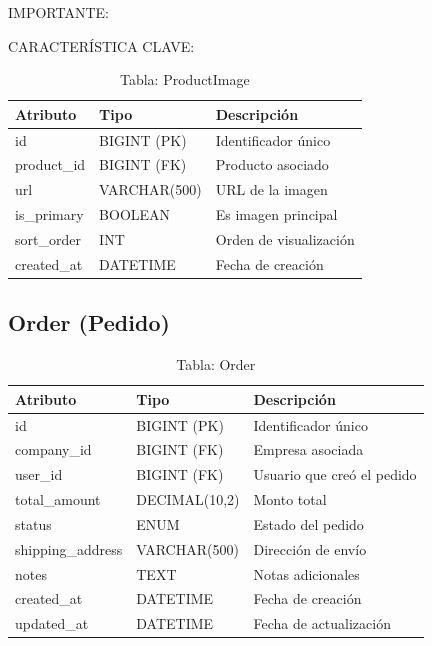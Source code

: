 \documentclass[12pt,a4paper,oneside]{book}
\begin{document}
\begin{alert}{IMPORTANTE:}
\begin{info}{CARACTERÍSTICA CLAVE:}
\begin{table}[ht]
    \centering
    \caption{Tabla: ProductImage}
    \begin{tabular}{@{}lll@{}}
        \toprule
        \textbf{Atributo} & \textbf{Tipo} & \textbf{Descripción} \\
        \midrule
        id & BIGINT (PK) & Identificador único \\
        product\_id & BIGINT (FK) & Producto asociado \\
        url & VARCHAR(500) & URL de la imagen \\
        is\_primary & BOOLEAN & Es imagen principal \\
        sort\_order & INT & Orden de visualización \\
        created\_at & DATETIME & Fecha de creación \\
        \bottomrule
    \end{tabular}
\end{table}

\subsection{Order (Pedido)}
\label{sec:order}

\begin{table}[ht]
    \centering
    \caption{Tabla: Order}
    \begin{tabular}{@{}lll@{}}
        \toprule
        \textbf{Atributo} & \textbf{Tipo} & \textbf{Descripción} \\
        \midrule
        id & BIGINT (PK) & Identificador único \\
        company\_id & BIGINT (FK) & Empresa asociada \\
        user\_id & BIGINT (FK) & Usuario que creó el pedido \\
        total\_amount & DECIMAL(10,2) & Monto total \\
        status & ENUM & Estado del pedido \\
        shipping\_address & VARCHAR(500) & Dirección de envío \\
        notes & TEXT & Notas adicionales \\
        created\_at & DATETIME & Fecha de creación \\
        updated\_at & DATETIME & Fecha de actualización \\
        \bottomrule
    \end{tabular}
\end{table}


\end{info}
\end{alert}
\end{document}
